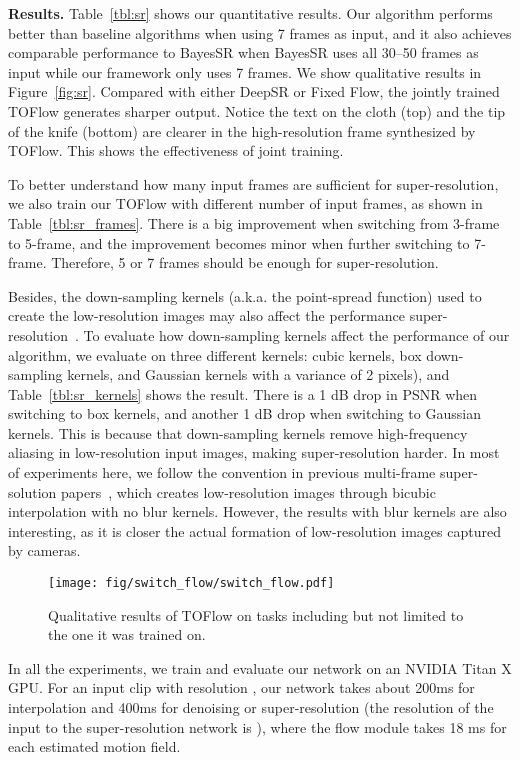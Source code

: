 \documentclass[twocolumn,natbib]{svjour3}          \smartqed  \usepackage{graphicx}
\newcommand{\fig}[1]{Figure~\ref{#1}}
\newcommand{\tbl}[1]{Table~\ref{#1}}
\def\model{TOFlow\xspace}
\def\toflow{TOFlow\xspace}
\def\fflow{Fixed Flow\xspace}
\newcommand{\myparagraph}[1]{\vspace{5pt}\noindent\textbf{#1}}
\begin{document}
 
\myparagraph{Results. }
\tbl{tbl:sr} shows our quantitative results. Our algorithm performs better than baseline algorithms when using 7 frames as input, and it also achieves comparable performance to BayesSR when BayesSR uses all 30--50 frames as input while our framework only uses 7 frames. 
We show qualitative results in \fig{fig:sr}. Compared with either DeepSR or \fflow, the jointly trained \toflow generates sharper output. Notice the text on the cloth (top) and the tip of the knife (bottom) are clearer in the high-resolution frame synthesized by \model.
This shows the effectiveness of joint training.

To better understand how many input frames are sufficient for super-resolution, we also train our \toflow with different number of input frames, as shown in \tbl{tbl:sr_frames}. There is a big improvement when switching from 3-frame to 5-frame, and the improvement becomes minor when further switching to 7-frame. Therefore, 5 or 7 frames should be enough for super-resolution.

Besides, the down-sampling kernels (a.k.a. the point-spread function) used to create the low-resolution images may also affect the performance super-resolution~\citep{liao2015video}. To evaluate how down-sampling kernels affect the performance of our algorithm, we evaluate on three different kernels: cubic kernels, box down-sampling kernels, and Gaussian kernels with a variance of 2 pixels), and \tbl{tbl:sr_kernels} shows the result. There is a 1 dB drop in PSNR when switching to box kernels, and another 1 dB drop when switching to Gaussian kernels. This is because that down-sampling kernels remove high-frequency aliasing in low-resolution input images, making super-resolution harder. In most of experiments here, we follow the convention in previous multi-frame super-solution papers~\citep{liu2011bayesian,tao2017detail}, which creates low-resolution images through bicubic interpolation with no blur kernels. However, the results with blur kernels are also interesting, as it is closer the actual formation of low-resolution images captured by cameras.

\begin{figure}[t]
\centering
\texttt{[image: fig/switch\_flow/switch\_flow.pdf]}
\caption{Qualitative results of \toflow on tasks including but not limited to the one it was trained on.}
\label{fig:switch_flow}
\end{figure}


 
In all the experiments, we train and evaluate our network on an NVIDIA Titan X GPU. For an input clip with resolution , our network takes about 200ms for interpolation and 400ms for denoising or super-resolution (the resolution of the input to the super-resolution network is ), where the flow module takes 18 ms for each estimated motion field.
\end{document}
